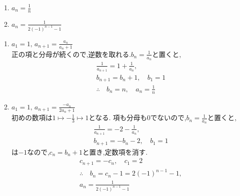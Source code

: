 \noindent{}\par\nobreak
\begin{enumerate}[label=(\arabic*),parsep=3pt,format=\bookitemlink{example-reciprocal-1}{answer}{solution}]
  \item $a_n=\frac{1}{n}$
  \item $a_n=\frac{1}{2(-1)^{n-1}-1}$
\end{enumerate}

\noindent{}\par\nobreak
\begin{enumerate}[label=(\arabic*),parsep=3pt,format=\bookitemlink{example-reciprocal-1}{solution}{problem}]
  \item $a_1=1,\, a_{n+1}=\frac{a_n}{a_n+1}$\\
    正の項と分母が続くので,逆数を取れる.$b_n=\frac{1}{a_n}$と置くと,
    \begin{align*}
      &\frac{1}{a_{n+1}}=1+\frac{1}{a_n},\\
      &b_{n+1}=b_n+1,\quad b_1=1\\
      &\therefore \quad b_n=n,\quad a_n=\frac1n
    \end{align*}
  \item $a_1=1,\, a_{n+1}=\frac{-a_n}{2a_n+1}$\\
    初めの数項は$1\longmapsto-\frac{1}{3}\longmapsto1$となる.
    項も分母も0でないので,$b_n=\frac{1}{a_n}$と置くと,
    \begin{align*}
      &\frac{1}{a_{n+1}}=-2-\frac{1}{a_n},\\
      &b_{n+1}=-b_n-2,\quad b_1=1
    \end{align*}
    は$-1$なので,$c_n=b_n+1$と置き,定数項を消す.
    \begin{align*}
      &c_{n+1}=-c_n,\quad c_1=2\\
      &\therefore \quad b_n=c_n-1=2(-1)^{n-1}-1,\\
      &a_n=\frac{1}{2(-1)^{n-1}-1}
    \end{align*}
\end{enumerate}
